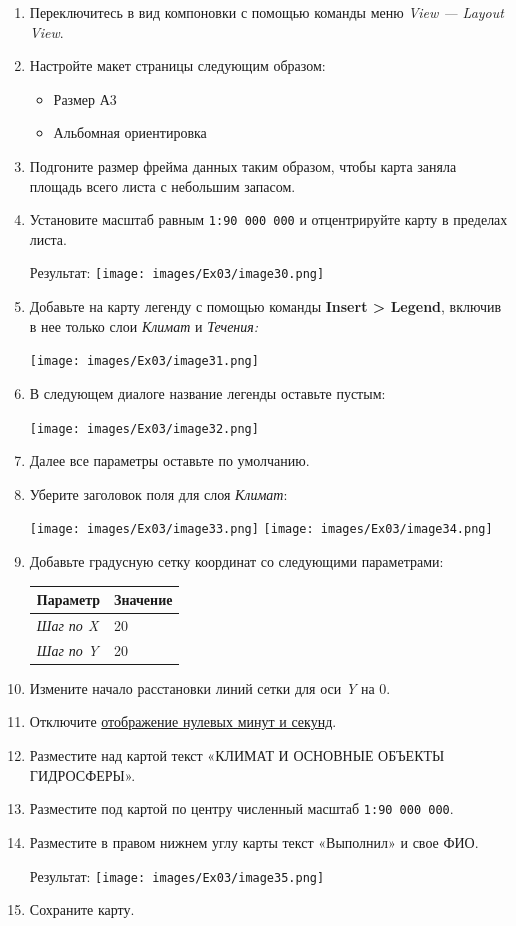 \documentclass[12pt,]{book}
\providecommand{\tightlist}{%
  \setlength{\itemsep}{0pt}\setlength{\parskip}{0pt}}
\begin{document}
\begin{enumerate}
\def\labelenumi{\arabic{enumi}.}
\item
  Переключитесь в вид компоновки с помощью команды меню \emph{View --- Layout View}.
\item
  Настройте макет страницы следующим образом:

  \begin{itemize}
  \tightlist
  \item
    Размер А3
  \item
    Альбомная ориентировка
  \end{itemize}
\item
  Подгоните размер фрейма данных таким образом, чтобы карта заняла площадь всего листа с небольшим запасом.
\item
  Установите масштаб равным \texttt{1:90\ 000\ 000} и отцентрируйте карту в пределах листа.

  Результат:
  \texttt{[image: images/Ex03/image30.png]}
\item
  Добавьте на карту легенду с помощью команды \textbf{Insert \textgreater{} Legend}, включив в нее только слои \emph{Климат} и \emph{Течения:}

  \texttt{[image: images/Ex03/image31.png]}
\item
  В следующем диалоге название легенды оставьте пустым:

  \texttt{[image: images/Ex03/image32.png]}
\item
  Далее все параметры оставьте по умолчанию.
\item
  Уберите заголовок поля для слоя \emph{Климат}:

  \texttt{[image: images/Ex03/image33.png]}
  \texttt{[image: images/Ex03/image34.png]}
\item
  Добавьте градусную сетку координат со следующими параметрами:

  \begin{longtable}[]{@{}ll@{}}
  \toprule
  \textbf{Параметр} & \textbf{Значение}\tabularnewline
  \midrule
  \endhead
  \emph{Шаг по X} & 20\tabularnewline
  \emph{Шаг по Y} & 20\tabularnewline
  \bottomrule
  \end{longtable}
\item
  Измените начало расстановки линий сетки для оси \emph{Y} на 0.
\item
  Отключите \protect\hyperlink{manual-projections-zero-degrees}{отображение нулевых минут и секунд}.
\item
  Разместите над картой текст «КЛИМАТ И ОСНОВНЫЕ ОБЪЕКТЫ ГИДРОСФЕРЫ».
\item
  Разместите под картой по центру численный масштаб \texttt{1:90\ 000\ 000}.
\item
  Разместите в правом нижнем углу карты текст «Выполнил» и свое ФИО.

  Результат:
  \texttt{[image: images/Ex03/image35.png]}
\item
  Сохраните карту.
\end{enumerate}
\end{document}
